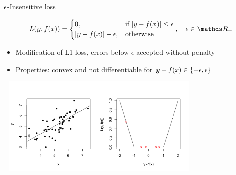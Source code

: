 \begin{vbframe}{$\epsilon$-Insensitive loss}

\vspace*{-0.3cm}
$$
\Lxy =  \begin{cases}
  0,  & \text{if } |y - \fx| \le \epsilon \\
  |y - \fx|-\epsilon, & \text{otherwise }
  \end{cases}, \quad \epsilon \in \R_{+}
$$
\begin{itemize}
\item Modification of L1-loss, errors below $\epsilon$ accepted without penalty
\item Properties: convex and not differentiable for $ y - f(x) \in \{-\epsilon, \epsilon\}$
\end{itemize}

\begin{center}
\includegraphics[width = 10cm, height = 4.7cm]{figure_man/2_6_loss_epsilon_plot1.png} \\
\end{center}

\end{vbframe}



